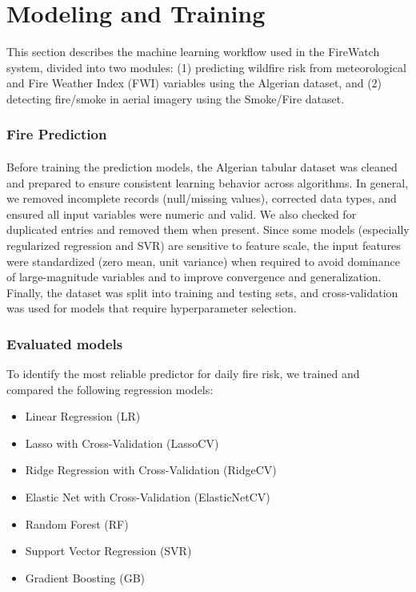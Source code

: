 \documentclass[11pt,a4paper]{report}
\begin{document}
\section{Modeling and Training }
\label{sec:modeling-training}

This section describes the machine learning workflow used in the FireWatch system, divided into two modules: (1) predicting wildfire risk from meteorological and Fire Weather Index (FWI) variables using the Algerian dataset, and (2) detecting fire/smoke in aerial imagery using the Smoke/Fire dataset.

\subsubsection{Fire Prediction}
\label{subsec:fire-prediction}

\paragraph{}
Before training the prediction models, the Algerian tabular dataset was cleaned and prepared to ensure consistent learning behavior across algorithms. In general, we removed incomplete records (null/missing values), corrected data types, and ensured all input variables were numeric and valid. We also checked for duplicated entries and removed them when present. Since some models (especially regularized regression and SVR) are sensitive to feature scale, the input features were standardized (zero mean, unit variance) when required to avoid dominance of large-magnitude variables and to improve convergence and generalization. Finally, the dataset was split into training and testing sets, and cross-validation was used for models that require hyperparameter selection.

\subsubsection{Evaluated models}
To identify the most reliable predictor for daily fire risk, we trained and compared the following regression models:

\begin{itemize}
    \item Linear Regression (LR)
    \item Lasso with Cross-Validation (LassoCV)
    \item Ridge Regression with Cross-Validation (RidgeCV)
    \item Elastic Net with Cross-Validation (ElasticNetCV)
    \item Random Forest (RF)
    \item Support Vector Regression (SVR)
    \item Gradient Boosting (GB)
\end{itemize}
\end{document}
